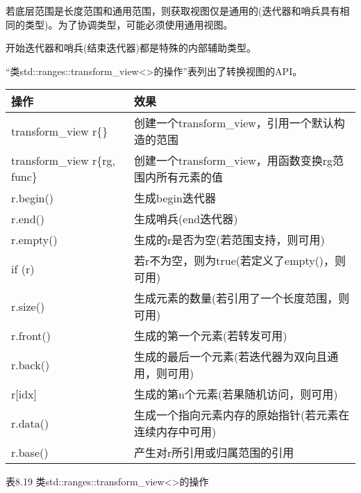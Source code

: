 若底层范围是长度范围和通用范围，则获取视图仅是通用的(迭代器和哨兵具有相同的类型)。为了协调类型，可能必须使用通用视图。

开始迭代器和哨兵(结束迭代器)都是特殊的内部辅助类型。


“类std::ranges::transform\_view<>的操作”表列出了转换视图的API。

\begin{longtable}[c]{|l|l|}
\hline
\textbf{操作} & \textbf{效果}                                                \\ \hline
\endfirsthead
%
\endhead
%
transform\_view r\{\}         & 创建一个transform\_view，引用一个默认构造的范围                               \\ \hline
transform\_view r\{rg, func\} & 创建一个transform\_view，用函数变换rg范围内所有元素的值          \\ \hline
r.begin()          & 生成begin迭代器                                      \\ \hline
r.end()            & 生成哨兵(end迭代器)                             \\ \hline
r.empty()          & 生成的r是否为空(若范围支持，则可用) \\ \hline
if (r)             & 若r不为空，则为true(若定义了empty()，则可用)         \\ \hline
r.size()           & 生成元素的数量(若引用了一个长度范围，则可用)                            \\ \hline
r.front()          & 生成的第一个元素(若转发可用)              \\ \hline
r.back()           & 生成的最后一个元素(若迭代器为双向且通用，则可用) \\ \hline
r{[}idx{]}         & 生成的第n个元素(若果随机访问，则可用)            \\ \hline
r.data()           & 生成一个指向元素内存的原始指针(若元素在连续内存中可用) \\ \hline
r.base()           & 产生对r所引用或归属范围的引用       \\ \hline
\end{longtable}

\begin{center}
表8.19 类std::ranges::transform\_view<>的操作
\end{center}

